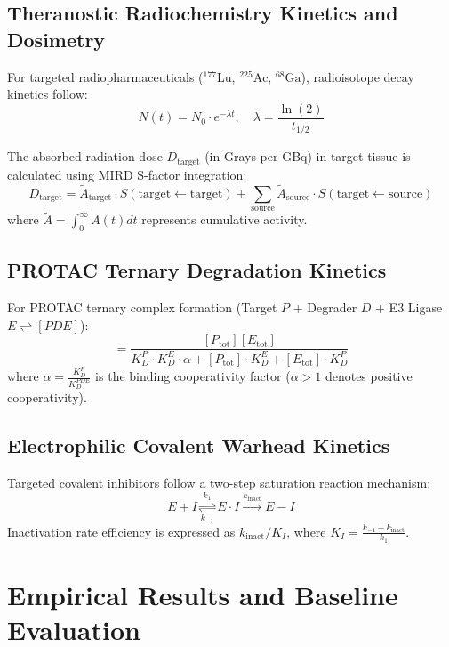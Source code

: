 \documentclass[10pt,journal,compsoc]{IEEEtran}
\begin{document}
\subsection{Theranostic Radiochemistry Kinetics and Dosimetry}
For targeted radiopharmaceuticals ($^{177}\text{Lu}$, $^{225}\text{Ac}$, $^{68}\text{Ga}$), radioisotope decay kinetics follow:
\begin{equation}
N(t) = N_0 \cdot e^{-\lambda t}, \quad \lambda = \frac{\ln(2)}{t_{1/2}}
\end{equation}

The absorbed radiation dose $D_{\text{target}}$ (in Grays per GBq) in target tissue is calculated using MIRD S-factor integration:
\begin{equation}
D_{\text{target}} = \tilde{A}_{\text{target}} \cdot S(\text{target} \leftarrow \text{target}) + \sum_{\text{source}} \tilde{A}_{\text{source}} \cdot S(\text{target} \leftarrow \text{source})
\end{equation}
where $\tilde{A} = \int_{0}^{\infty} A(t) dt$ represents cumulative activity.

\subsection{PROTAC Ternary Degradation Kinetics}
For PROTAC ternary complex formation (Target $P$ + Degrader $D$ + E3 Ligase $E \rightleftharpoons [PDE]$):
\begin{equation}
[PDE] = \frac{[P_{\text{tot}}][E_{\text{tot}}]}{K_D^{P} \cdot K_D^{E} \cdot \alpha + [P_{\text{tot}}] \cdot K_D^{E} + [E_{\text{tot}}] \cdot K_D^{P}}
\end{equation}
where $\alpha = \frac{K_D^{P}}{K_D^{PDE}}$ is the binding cooperativity factor ($\alpha > 1$ denotes positive cooperativity).

\subsection{Electrophilic Covalent Warhead Kinetics}
Targeted covalent inhibitors follow a two-step saturation reaction mechanism:
\begin{equation}
E + I \underset{k_{-1}}{\overset{k_1}{\rightleftharpoons}} E \cdot I \xrightarrow{k_{\text{inact}}} E-I
\end{equation}
Inactivation rate efficiency is expressed as $k_{\text{inact}} / K_I$, where $K_I = \frac{k_{-1} + k_{\text{inact}}}{k_1}$.

\section{Empirical Results and Baseline Evaluation}
\end{document}
